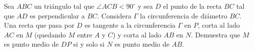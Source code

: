 Sea $ABC$ un triángulo tal que $\angle ACB<90^{\circ}$ y sea $D$ el punto de la recta $BC$ tal que $AD$ es perpendicular a $BC$. Considera $\Gamma$ la circunferencia de diámetro $BC$. Una recta que pasa por $D$ es tangente a la circunferencia $\Gamma$ en $P$, corta al lado $AC$ en $M$ (quedando $M$ entre $A$ y $C$) y corta al lado $AB$ en $N$. Demuestra que $M$ es punto medio de $DP$ si y solo si $N$ es punto medio de $AB$.